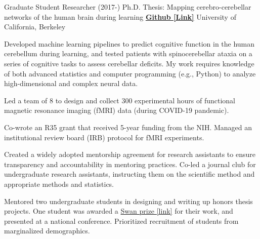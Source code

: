 

\begin{cventries}

  \cventry
    {Graduate Student Researcher (2017-)} %
    {Ph.D. Thesis: Mapping cerebro-cerebellar networks of the human brain during learning}
    {\href{https://github.com/maedbhk/cerebellum_learning_connect}{\textbf{Github [Link]}}}
    {University of California, Berkeley} %
    {
      \begin{cvitems} %
        \item {Developed machine learning pipelines to predict cognitive function in the human cerebellum during learning, and tested patients with spinocerebellar ataxia on a series of cognitive tasks to assess cerebellar deficits. My work requires knowledge of both advanced statistics and computer programming (e.g., Python) to analyze high-dimensional and complex neural data.} 
        \item {Led a team of 8 to design and collect 300 experimental hours of functional magnetic resonance imaging (fMRI) data (during COVID-19 pandemic).}
        \item {Co-wrote an R35 grant that received 5-year funding from the NIH. Managed an institutional review board (IRB) protocol for fMRI experiments.}
        \item {Created a widely adopted mentorship agreement for research assistants to ensure transparency and accountability in mentoring practices. Co-led a journal club for undergraduate research assistants, instructing them on the scientific method and appropriate methods and statistics.}
        \item {Mentored two undergraduate students in designing and writing up honors thesis projects. One student was awarded a \href{https://psychology.berkeley.edu/sites/default/files/undergraduate-program/swanaward_application_2019-2020.pdf}{Swan prize [link]} for their work, and presented at a national conference. Prioritized recruitment of students from marginalized demographics.}
      \end{cvitems}
    }
    

\end{cventries}
